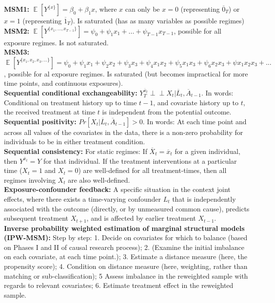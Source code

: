 \documentclass[a4paper,7pt,landscape]{extarticle}
\newcommand{\indep}{\perp \!\!\! \perp} %
\DeclareMathOperator*{\E}{\mathbb{E}} %
\begin{document}
\begin{multicols}{3}
\begin{boxA}
\textbf{MSM1:} $\E [Y^{\{x\}}] = \beta_0 + \beta_1 x$, where $x$ can only be $x = 0$ (representing $\overline{0}_T$) or $x = 1$ (representing $\overline{1}_T$). Is saturated (has as many variables as possible regimes)\\
\textbf{MSM2:} $\E [Y^{\{x_1,...,x_{T-1}\}}] = \psi_0 + \psi_1 x_1 + ... + \psi_{T-1} x_{T-1}$, possible for all exposure regimes. Is not saturated.\\
\textbf{MSM3:} $\E [Y^{\{x_1,x_2,x_3,...\}}] = \psi_0 + \psi_1 x_1 + \psi_2 x_2 + \psi_3 x_3 + \psi_4 x_1 x_2 + \psi_5 x_1 x_3 + \psi_6 x_2 x_3 + \psi x_1 x_2 x_3 + ...$, possible for al exposure regimes. Is saturated (but becomes impractical for more time points, and continuous exposures).\\
\textbf{Sequential conditional exchangeability:} $Y_T^{\overline{x}_t} \indep X_t | \overline{L}_{t}, \overline{A}_{t-1}$. In words: Conditional on treatment history up to time $t - 1$, and covariate history up to $t$, the received treatment at time $t$ is independent from the potential outcome.\\
\textbf{Sequential positivity:} $Pr[X_t | \overline{L}_t, \overline{A}_{t-1}] > 0$. In words: At each time point and across all values of the covariates in the data, there is a non-zero probability for individuals to be in either treatment condition.\\
\textbf{Sequential consistency:} For static regimes: If $\overline{X}_t = \overline{x}_t$ for a given individual, then $Y^{\overline{x}_t} = Y$ for that individual. If the treatment interventions at a particular time ($X_t = 1$ and $X_t = 0$) are well-defined for all treatment-times, then all regimes involving $X_t$ are also well-defined.\\
\textbf{Exposure-confounder feedback:} A specific situation in the context joint effects, where there exists a time-varying confounder $L_t$ that is independently associated with the outcome (directly, or by unmeasured common cause), predicts subsequent treatment $X_{t+1}$, and is affected by earlier treatment $X_{t-1}$.\\
\textbf{Inverse probability weighted estimation of marginal structural models (IPW-MSM):} Step by step: 1. Decide on covariates for which to balance (based on Phases I and II of causal research process); 2. (Examine the initial imbalance on each covariate, at each time point.); 3. Estimate a distance measure (here, the propensity score); 4. Condition on distance measure (here, weighting, rather than matching or sub-classification); 5 Assess imbalance in the reweighted sample with regards to relevant covariates; 6. Estimate treatment effect in the reweighted sample.\\

\end{boxA}
\end{multicols}
\end{document}
